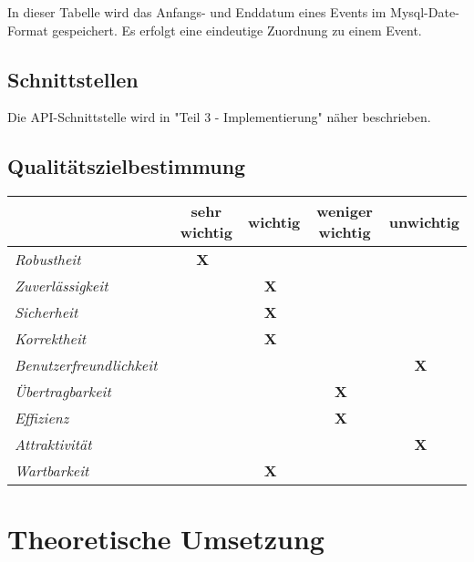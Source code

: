 \documentclass[12pt,parskip=full, pagea4]{scrreprt}
\begin{document}
			In dieser Tabelle wird das Anfangs- und Enddatum eines Events im Mysql-Date-Format gespeichert. Es erfolgt eine eindeutige Zuordnung zu einem Event. 
					
		\chapter{Schnittstellen}
		
		Die API-Schnittstelle wird in "Teil 3 - Implementierung" näher beschrieben. 
		
		\chapter{Qualitätszielbestimmung}
		
			\begin{center}
				\begin{tabular}{||l|c|c|c|c||} 
					\hline
					~ & sehr wichtig & wichtig & weniger wichtig & unwichtig\\
					\hline \hline
					\textit{Robustheit}~ & \textbf{X}~ & ~ ~ ~ & ~ ~ ~ &  ~ ~ ~ \\
					\hline
					\textit{Zuverlässigkeit}~ & ~ ~ ~ &  \textbf{X}~ &  ~ ~ ~ &  ~ ~ ~ \\
					\hline
					\textit{Sicherheit}~ & ~ ~ ~ &  \textbf{X}~ &  ~ ~ ~ &  ~ ~ ~ \\
					\hline
					\textit{Korrektheit}~ & ~ ~ ~ &  \textbf{X}~ &  ~ ~ ~ &  ~ ~ ~ \\
					\hline
					\textit{Benutzerfreundlichkeit}~ &  ~ ~ ~ & ~ ~ ~ &  ~ ~ ~ &  \textbf{X}~ \\
					\hline
					\textit{Übertragbarkeit}~ &  ~ ~ ~ & ~ ~ ~ &  \textbf{X}~ &  ~ ~ ~ \\
					\hline
					\textit{Effizienz}~ &  ~ ~ ~ &  ~ ~ ~ & \textbf{X}~ &  ~ ~ ~ \\
					\hline
					\textit{Attraktivität}~ &  ~ ~ ~ &  ~ ~ ~ & ~ ~ ~ &  \textbf{X}~ \\
					\hline
					\textit{Wartbarkeit}~ &  ~ ~ ~ & \textbf{X}~ &  ~ ~ ~ &  ~ ~ ~ \\
					\hline
				\end{tabular}
			\end{center}
		
\makeatletter
{}
\makeatother	
	
	\part{Theoretische Umsetzung}
		
\end{document}
